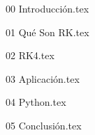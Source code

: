 \documentclass[12pt, a4paper]{article}
\begin{document}
\sffamily


\tableofcontents
\newpage

{00 Introducción.tex}
\newpage

{01 Qué Son RK.tex}
\newpage

{02 RK4.tex}
\newpage

{03 Aplicación.tex}
\newpage

{04 Python.tex}
\newpage

{05 Conclusión.tex}
\newpage
\end{document}
